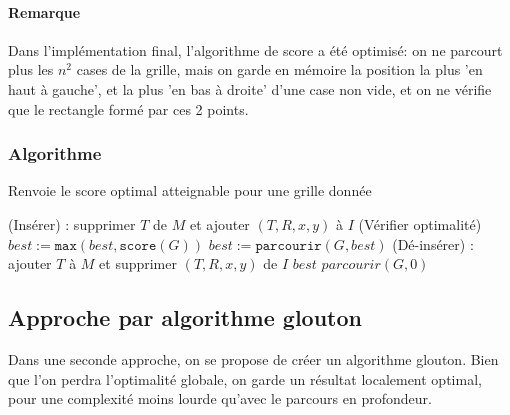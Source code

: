 \documentclass[10pt]{article}
\let\oldReturn\Return
\renewcommand{\Return}{\State\oldReturn}
\begin{document}
	  \paragraph{Remarque}
	  Dans l'implémentation final, l'algorithme de score a été optimisé: on ne parcourt plus les $n^2$ cases de la grille,
	  mais on garde en mémoire la position la plus 'en haut à gauche', et la plus 'en bas à droite' d'une case non vide,
	  et on ne vérifie que le rectangle formé par ces 2 points.
      \newpage
      \subsubsection{Algorithme}
	\begin{algorithm}
	  \caption{Renvoie le score optimal atteignable pour une grille donnée}
	  \begin{algorithmic}[1]
			  \State (Insérer) : supprimer $T$ de $M$ et ajouter $(T, R, x, y)$ à $I$
			  \State (Vérifier optimalité)
			    \State $best := \mathtt{max}(best, \mathtt{score}(G))$
			  \Else
			    \State $best := \mathtt{parcourir}(G, best)$
			  \EndIf
			  \State (Dé-insérer) : ajouter $T$ à $M$ et supprimer $(T, R, x, y)$ de $I$
			\EndIf
		      \EndFor
		    \EndFor
		  \EndFor
		\EndFor
		\Return $best$
	      \EndFunction
	      \Return $parcourir(G, 0)$
	    \EndFunction
	  \end{algorithmic}
	\end{algorithm}
    \newpage
    \subsection{Approche par algorithme glouton}
      Dans une seconde approche, on se propose de créer un algorithme glouton. Bien que l'on perdra l'optimalité globale,
      on garde un résultat localement optimal, pour une complexité moins lourde qu'avec le parcours en profondeur.
\end{document}
